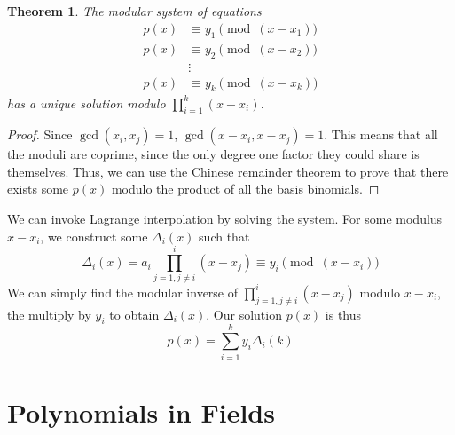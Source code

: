 \documentclass{article}
\newtheorem{theorem}{Theorem}
\begin{document}
\subsection{}

\begin{theorem}
    The modular system of equations
    \begin{align}
        p(x) &\equiv y_1 \pmod{(x - x_1)} \\
        p(x) &\equiv y_2 \pmod{(x - x_2)} \\
        &\vdots \\
        p(x) &\equiv y_k \pmod{(x - x_k)}
    \end{align}
    has a unique solution modulo \(\prod_{i = 1}^k (x - x_i)\).
\end{theorem}
\begin{proof}
    Since \(\gcd(x_i, x_j) = 1\), \(\gcd(x - x_i, x - x_j) = 1\).
    This means that all the moduli are coprime, since the only degree one factor they could share is themselves.
    Thus, we can use the Chinese remainder theorem to prove that there exists some \(p(x)\) modulo the product of all the basis binomials.
\end{proof}
We can invoke Lagrange interpolation by solving the system.
For some modulus \(x - x_i\), we construct some \(\Delta_i(x)\) such that
\begin{equation}
    \Delta_i(x) = a_i \prod_{j = 1, j \neq i}^i (x - x_j) \equiv y_i \pmod{(x - x_i)}
\end{equation}
We can simply find the modular inverse of \(\prod_{j = 1, j \neq i}^i (x - x_j)\) modulo \(x - x_i\), the multiply by \(y_i\) to obtain \(\Delta_i(x)\).
Our solution \(p(x)\) is thus
\begin{equation}
    p(x) = \sum_{i = 1}^k y_i \Delta_i(k)
\end{equation}

\section{Polynomials in Fields}

\subsection{}
\end{document}
